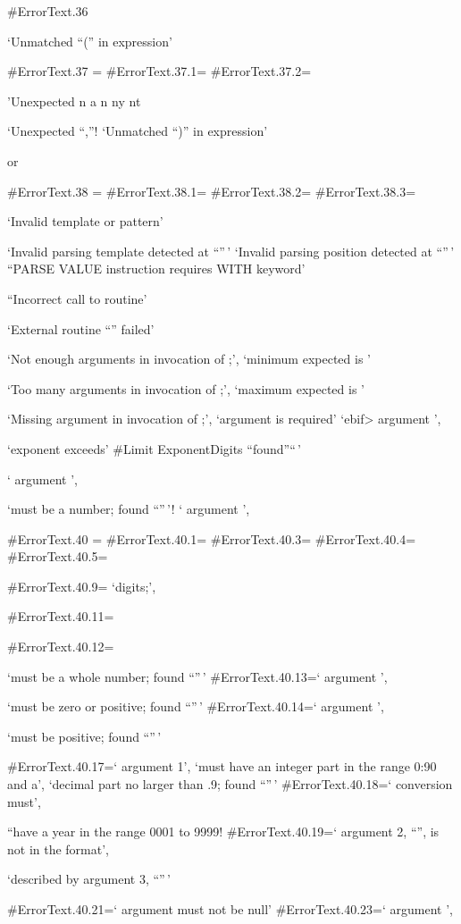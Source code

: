 \#ErrorText.36

`Unmatched ``('' in expression'

\#ErrorText.37 = \#ErrorText.37.1= \#ErrorText.37.2=

'Unexpected n a n ny nt

`Unexpected ``,''! `Unmatched ``)'' in expression'

or

\#ErrorText.38 = \#ErrorText.38.1= \#ErrorText.38.2= \#ErrorText.38.3=

`Invalid template or pattern'

`Invalid parsing template detected at ``''\,' `Invalid parsing position
detected at ``''\,' ``PARSE VALUE instruction requires WITH keyword'

``Incorrect call to routine'

`External routine ``'' failed'

`Not enough arguments in invocation of ;', `minimum expected is '

`Too many arguments in invocation of ;', `maximum expected is '

`Missing argument in invocation of ;', `argument is required'
`ebif\textgreater{} argument ',

`exponent exceeds' \#Limit ExponentDigits ``found''``\,'

` argument ',

`must be a number; found ``''\,'! ` argument ',

\#ErrorText.40 = \#ErrorText.40.1= \#ErrorText.40.3= \#ErrorText.40.4=
\#ErrorText.40.5=

\#ErrorText.40.9= `digits;',

\#ErrorText.40.11=

\#ErrorText.40.12=

`must be a whole number; found ``''\,' \#ErrorText.40.13=` argument ',

`must be zero or positive; found ``''\,' \#ErrorText.40.14=` argument ',

`must be positive; found ``''\,'

\#ErrorText.40.17=` argument 1', `must have an integer part in the range
0:90 and a', `decimal part no larger than .9; found ``''\,'
\#ErrorText.40.18=` conversion must',

``have a year in the range 0001 to 9999! \#ErrorText.40.19=` argument 2,
``'', is not in the format',

`described by argument 3, ``''\,'

\#ErrorText.40.21=` argument must not be null' \#ErrorText.40.23=`
argument ',

